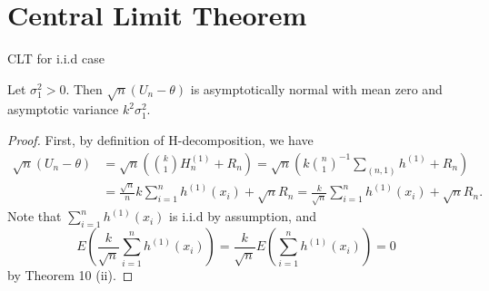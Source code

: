 \documentclass{beamer}
\theoremstyle{definition}
\numberwithin{Def}{section}
\begin{document}
\section{Central Limit Theorem}
\begin{frame}{CLT for i.i.d case}
\begin{fontsize}{7}{12}  
\begin{theorem}
    Let $\sigma_1^{2} > 0$. Then $\sqrt{n}(U_n - \theta)$ is asymptotically normal with mean zero and asymptotic variance $k^2 \sigma_1^2$.
    \end{theorem}
    
    \begin{proof}
      First, by definition of H-decomposition, we have 
      \begin{align*}
          \sqrt{n}(U_n - \theta) &= \sqrt{n} \left( {k \choose 1} H_n^{(1)} + R_n \right) 
          = \sqrt{n} \left( k {n \choose 1}^{-1} \sum_{ (n,1) } h^{(1)} + R_n \right) \\
          &= \frac{\sqrt{n}}{n} k \sum_{i = 1}^{n} h^{(1)}(x_i) + \sqrt{n}R_n 
          = \frac{k}{\sqrt{n}} \sum_{i = 1}^{n} h^{(1)}(x_i) + \sqrt{n}R_n.
          \end{align*}
      Note that $\sum_{i = 1}^{n} h^{(1)}(x_i)$ is i.i.d by assumption, and $$ E (\frac{k}{\sqrt{n}} \sum_{i = 1}^{n} h^{(1)}(x_i)) = \frac{k}{\sqrt{n}} E( \sum_{i = 1}^{n}h^{(1)} (x_i) ) = 0$$
      by Theorem 10 (ii). 
      \end{proof}
      \end{fontsize}
      \end{frame}
      
\end{document}
